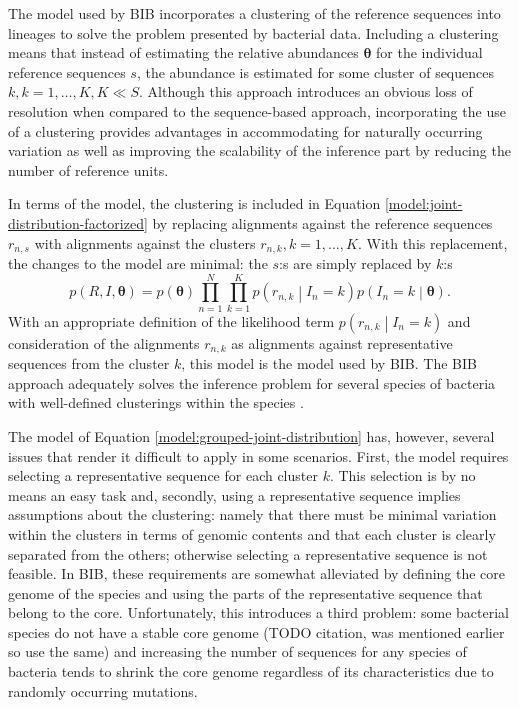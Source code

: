 \documentclass[officiallayout]{tktla}
\begin{document}
The model used by BIB incorporates a clustering of the reference
sequences into lineages to solve the problem presented by bacterial
data. Including a clustering means that instead of estimating the
relative abundances $\boldsymbol\theta$ for the individual reference
sequences $s$, the abundance is estimated for some cluster of
sequences $k, k = 1, \dots, K, K \ll S$. Although this approach
introduces an obvious loss of resolution when compared to the
sequence-based approach, incorporating the use of a clustering
provides advantages in accommodating for naturally occurring variation
as well as improving the scalability of the inference part by reducing
the number of reference units.

In terms of the model, the clustering is included in Equation
\eqref{model:joint-distribution-factorized} by replacing alignments
against the reference sequences $r_{n, s}$ with alignments against the
clusters $r_{n, k}, k = 1, \dots, K$. With this replacement, the
changes to the model are minimal: the $s$:s are simply replaced by
$k$:s
\begin{equation}
  \label{model:grouped-joint-distribution}
  p\left(R, I, \boldsymbol\theta\right) = p\left(\boldsymbol\theta\right)\prod_{n = 1}^{N} \prod_{k = 1}^{K} p\left(r_{n, k} \middle| I_{n} = k\right) p\left(I_{n} = k \middle| \boldsymbol\theta\right).
\end{equation}
With an appropriate definition of the likelihood term $p\left(r_{n, k}
\middle| I_{n} = k\right)$ and consideration of the alignments $r_{n,
  k}$ as alignments against representative sequences from the cluster
$k$, this model is the model used by BIB. The BIB approach adequately
solves the inference problem for several species of bacteria with
well-defined clusterings within the species
\citep{sankar2016bayesian}.

The model of Equation \eqref{model:grouped-joint-distribution} has,
however, several issues that render it difficult to apply in some
scenarios. First, the model requires selecting a representative
sequence for each cluster $k$. This selection is by no means an easy
task and, secondly, using a representative sequence implies
assumptions about the clustering: namely that there must be minimal
variation within the clusters in terms of genomic contents and that
each cluster is clearly separated from the others; otherwise selecting
a representative sequence is not feasible. In BIB, these requirements
are somewhat alleviated by defining the core genome of the species and
using the parts of the representative sequence that belong to the
core. Unfortunately, this introduces a third problem: some bacterial
species do not have a stable core genome (TODO citation, was mentioned
earlier so use the same) and increasing the number of sequences for
any species of bacteria tends to shrink the core genome regardless of
its characteristics due to randomly occurring mutations.
\end{document}
